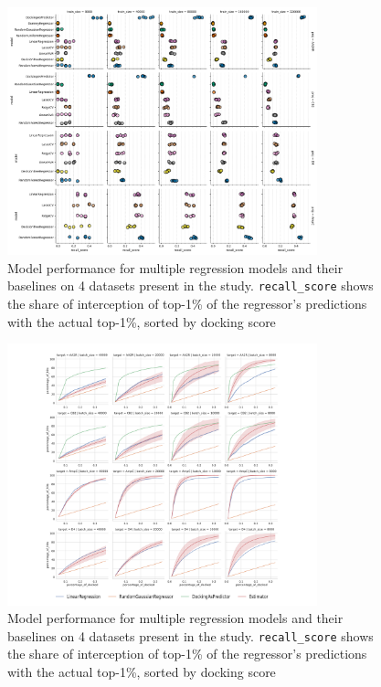\begin{figure}[h]
\centering
\includegraphics[width=0.8\textwidth]{figures/figure_3_single-shot-performance.png}
\caption{Model performance for multiple regression models and their baselines on 4 datasets present in the study. \texttt{recall\_score} shows the share of interception of top-1\% of the regressor's predictions with the actual top-1\%, sorted by docking score}
\label{fig:fig_3}
\end{figure}


\begin{figure}[h]
\centering
\includegraphics[width=0.8\textwidth]{figures/figure_4_iterations.pdf}
\caption{Model performance for multiple regression models and their baselines on 4 datasets present in the study. \texttt{recall\_score} shows the share of interception of top-1\% of the regressor's predictions with the actual top-1\%, sorted by docking score}
\label{fig:fig_3}
\end{figure}


